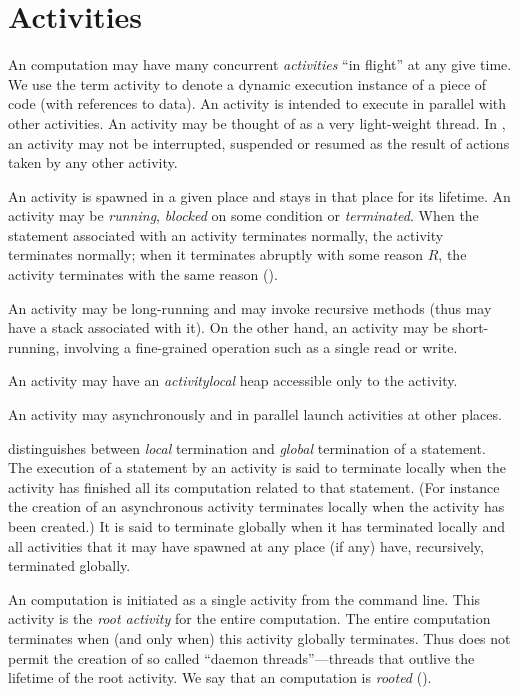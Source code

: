 \chapter{Activities}\label{XtenActivities}

An \Xten{} computation may have many concurrent {\em activities} ``in
flight'' at any give time. We use the term activity to denote a
dynamic execution instance of a piece of code (with references to
data). An activity is intended to execute in parallel with other
activities. An activity may be thought of as a very light-weight
thread.  In \XtenCurrVer{}, an activity may not be interrupted,
suspended or resumed as the result of actions taken by any other
activity.

An activity is spawned in a given place and stays in that place for
its lifetime.  An activity may be {\em running}, {\em blocked} on some
condition or {\em terminated}. When the statement associated with an
activity terminates normally, the activity terminates normally; when
it terminates abruptly with some reason $R$, the activity terminates
with the same reason ().

An activity may be long-running and may invoke recursive methods (thus
may have a stack associated with it). On the other hand, an activity
may be short-running, involving a fine-grained operation such as a
single read or write.

An activity may have an {\em activitylocal} heap accessible only
to the activity. 

An activity may asynchronously and in parallel launch activities at
other places.

\Xten{} distinguishes between {\em local} termination and {\em global}
termination of a statement. The execution of a statement by an
activity is said to terminate locally when the activity has finished
all its computation related to that statement. (For instance the
creation of an asynchronous activity terminates locally when the
activity has been created.)  It is said to terminate globally when it
has terminated locally and all activities that it may have spawned at
any place (if any) have, recursively, terminated globally.

An \Xten{} computation is initiated as a single activity from the
command line. This activity is the {\em root activity} for the entire computation. The entire computation
terminates when (and only when) this activity globally
terminates. Thus \Xten{} does not permit the creation of so called
``daemon threads''---threads that outlive the lifetime of the root
activity. We say that an \Xten{} computation is {\em rooted}
().

